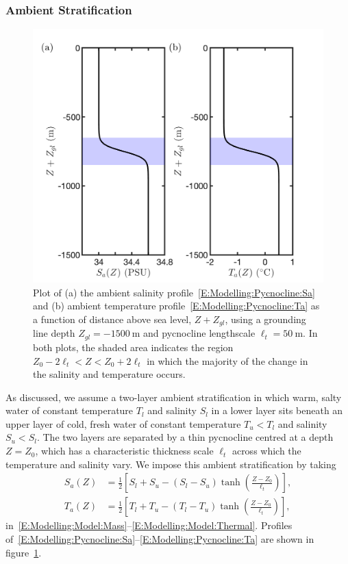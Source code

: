 \documentclass[openacc]{rsproca_new}%
\begin{document}
\subsubsection{Ambient Stratification}\label{S:Model:Pycnocline}
\begin{figure}
\centering
\includegraphics[scale =0.5]{Submitted_PRSA/make_plots/plots/figure2.png}
\caption{Plot of (a) the ambient salinity profile~\eqref{E:Modelling:Pycnocline:Sa} and (b) ambient temperature profile~\eqref{E:Modelling:Pycnocline:Ta} as a function of distance above sea level, $Z + Z_{gl}$, using a grounding line depth $Z_{gl} = -1500~\si{\meter}$ and pycnocline lengthscale $\ell_t = 50~\si{\meter}$. In both plots, the shaded area indicates the region $Z_0 - 2\ell_t < Z < Z_0 + 2\ell_t$ in which the majority of the change in the salinity and temperature occurs.}\label{fig:Pycnocline_Profiles}
\end{figure}

As discussed, we assume a two-layer ambient stratification in which warm, salty water of constant temperature $T_l$ and salinity $S_l$ in a lower layer sits beneath an upper layer of cold, fresh water of constant temperature $T_u < T_l$ and salinity $S_u < S_l$. The two layers are separated by a thin pycnocline centred at a depth $Z = Z_0$, which has a characteristic thickness scale $\ell_t$ across which the temperature and salinity vary. We impose this ambient stratification by taking
\begin{align}
S_a(Z) &= \frac{1}{2}\left[S_l + S_u - (S_l - S_u)\tanh\left(\frac{Z - Z_0}{\ell_t}\right)\right],\label{E:Modelling:Pycnocline:Sa}\\
T_a(Z) &= \frac{1}{2}\left[T_l + T_u - (T_l - T_u)\tanh\left(\frac{Z - Z_0}{\ell_t}\right)\right],\label{E:Modelling:Pycnocline:Ta}
\end{align}
in~\eqref{E:Modelling:Model:Mass}--\eqref{E:Modelling:Model:Thermal}. Profiles of~\eqref{E:Modelling:Pycnocline:Sa}--\eqref{E:Modelling:Pycnocline:Ta} are shown in figure~\ref{fig:Pycnocline_Profiles}. 
\end{document}
